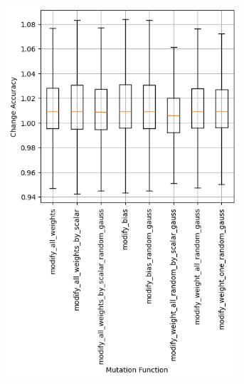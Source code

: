 \begin{figure}
    \begin{subfigure}{0.5\textwidth}
        \centering
        \includegraphics[width=0.95\textwidth]{plots/Mutatation_Trained_accuracy.png}
    \end{subfigure}
    \begin{subfigure}{0.5\textwidth}
        \centering

\end{subfigure}
\end{figure}
